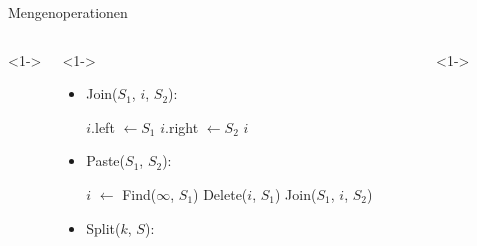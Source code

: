 \documentclass[t]{beamer}
\theoremstyle{plain}
\begin{document}
\begin{frame}{Mengenoperationen}
    \begin{columns}<1->
    \begin{column}{.65\textwidth}<1->
        \begin{itemize}
            \item<1> Join($S_1$, $i$, $S_2$):
                \begin{algorithm}[H]
                    $i$.left $\gets S_1$ \;
                    $i$.right $\gets S_2$ \;
                    \Return $i$
                \end{algorithm}
            \item<2> Paste($S_1$, $S_2$):
                \begin{algorithm}[H]
                    $i$ $\gets$ Find($\infty$, $S_1$) 
                    Delete($i$, $S_1$) \;
                    \Return Join($S_1$, $i$, $S_2$) \;
                \end{algorithm}
            \item<3> Split($k$, $S$):
                \begin{algorithm}[H]
                \end{algorithm}
        \end{itemize}
    \end{column}
    \begin{column}{.35\textwidth}<1->
    \end{column}
    \end{columns}
\end{frame}
\end{document}
